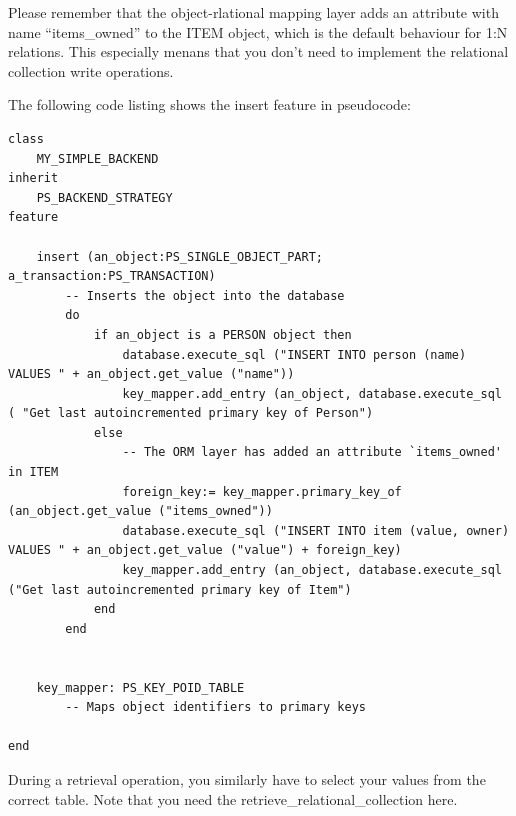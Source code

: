 Please remember that the object-rlational mapping layer adds an attribute with name ``items\_owned'' to the ITEM object, which is the default behaviour for 1:N relations.
This especially menans that you don't need to implement the relational collection write operations.

The following code listing shows the insert feature in pseudocode:

\begin{lstlisting}[language=OOSC2Eiffel, captionpos=b, caption={The collection handler for LINKED\_LIST}, label={lst:my_backend_adaption}]
class 
	MY_SIMPLE_BACKEND
inherit
	PS_BACKEND_STRATEGY
feature

	insert (an_object:PS_SINGLE_OBJECT_PART; a_transaction:PS_TRANSACTION)
		-- Inserts the object into the database
		do
			if an_object is a PERSON object then
				database.execute_sql ("INSERT INTO person (name) VALUES " + an_object.get_value ("name"))
				key_mapper.add_entry (an_object, database.execute_sql ( "Get last autoincremented primary key of Person")
			else
				-- The ORM layer has added an attribute `items_owned' in ITEM
				foreign_key:= key_mapper.primary_key_of (an_object.get_value ("items_owned"))
				database.execute_sql ("INSERT INTO item (value, owner) VALUES " + an_object.get_value ("value") + foreign_key)
				key_mapper.add_entry (an_object, database.execute_sql ("Get last autoincremented primary key of Item")
			end
		end


	key_mapper: PS_KEY_POID_TABLE
		-- Maps object identifiers to primary keys

end
\end{lstlisting}

During a retrieval operation, you similarly have to select your values from the correct table.
Note that you need the retrieve\_relational\_collection here.







